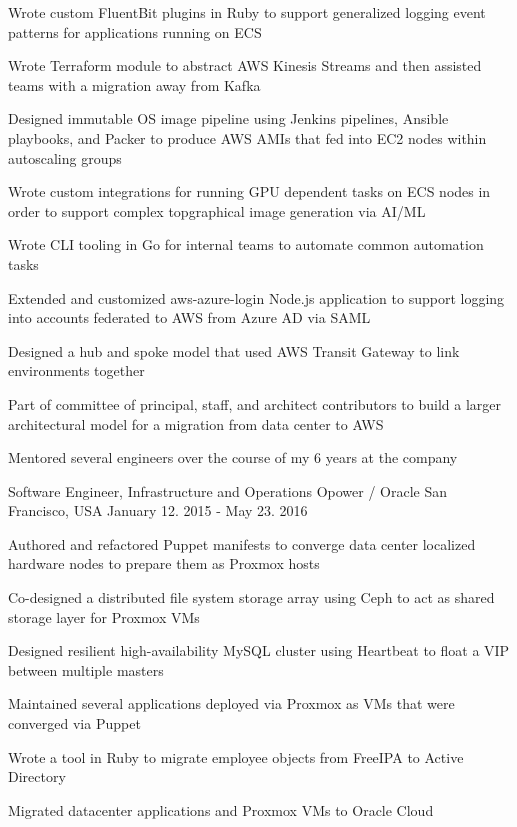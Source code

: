 \begin{cventries}
{\begin{cvitems}
        \item Wrote custom FluentBit plugins in Ruby to support generalized logging event patterns for applications running on ECS
        \item {Wrote Terraform module to abstract AWS Kinesis Streams and then assisted teams with a migration away from Kafka}
        \item {Designed immutable OS image pipeline using Jenkins pipelines, Ansible playbooks, and Packer to produce AWS AMIs that fed into EC2 nodes within autoscaling groups}
        \item {Wrote custom integrations for running GPU dependent tasks on ECS nodes in order to support complex topgraphical image generation via AI/ML}
        \item {Wrote CLI tooling in Go for internal teams to automate common automation tasks}
        \item {Extended and customized aws-azure-login Node.js application to support logging into accounts federated to AWS from Azure AD via SAML}
        \item {Designed a hub and spoke model that used AWS Transit Gateway to link environments together}
        \item {Part of committee of principal, staff, and architect contributors to build a larger architectural model for a migration from data center to AWS}
        \item {Mentored several engineers over the course of my 6 years at the company}
      \end{cvitems}
    }

  \cventry
    {Software Engineer, Infrastructure and Operations} %
    {Opower / Oracle} %
    {San Francisco, USA} %
    {January 12. 2015 - May 23. 2016} %
    {
      \begin{cvitems} %
        \item {Authored and refactored Puppet manifests to converge data center localized hardware nodes to prepare them as Proxmox hosts}
        \item {Co-designed a distributed file system storage array using Ceph to act as shared storage layer for Proxmox VMs}
        \item {Designed resilient high-availability MySQL cluster using Heartbeat to float a VIP between multiple masters}
        \item {Maintained several applications deployed via Proxmox as VMs that were converged via Puppet}
        \item {Wrote a tool in Ruby to migrate employee objects from FreeIPA to Active Directory}
        \item {Migrated datacenter applications and Proxmox VMs to Oracle Cloud}
      \end{cvitems}
    }


\end{cventries}
